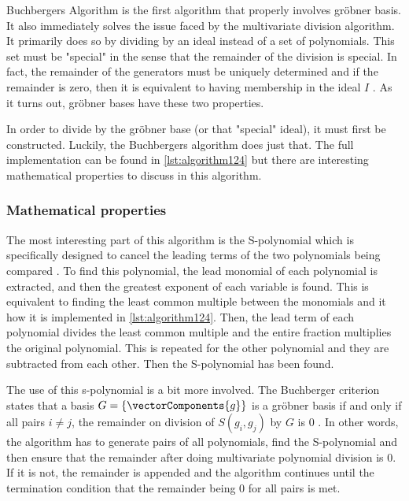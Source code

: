 Buchbergers Algorithm is the first algorithm that properly involves gröbner basis. It also immediately solves the issue faced by the multivariate division algorithm. It primarily does so by dividing by an ideal instead of a set of polynomials. This set must be "special" in the sense that the remainder of the division is special. In fact, the remainder of the generators must be uniquely determined and if the remainder is zero, then it is equivalent to having membership in the ideal $I$ \cite{Applied}. As it turns out, gröbner bases have these two properties.

In order to divide by the gröbner base (or that "special" ideal), it must first be constructed. Luckily, the Buchbergers algorithm does just that. The full implementation can be found in \ref{lst:algorithm124} but there are interesting mathematical properties to discuss in this algorithm. 

\subsubsection{Mathematical properties}
The most interesting part of this algorithm is the S-polynomial which is specifically designed to cancel the leading terms of the two polynomials being compared \cite{Applied}. To find this polynomial, the lead monomial of each polynomial is extracted, and then the greatest exponent of each variable is found. This is equivalent to finding the least common multiple between the monomials and it how it is implemented in \ref{lst:algorithm124}. Then, the lead term of each polynomial divides the least common multiple and the entire fraction multiplies the original polynomial. This is repeated for the other polynomial and they are subtracted from each other. Then the S-polynomial has been found.

The use of this s-polynomial is a bit more involved. The Buchberger criterion states that a basis $G=\{\vectorComponents{g}\}$ is a gröbner basis if and only if all pairs $i \neq j$, the remainder on division of $S(g_i,g_j)$ by $G$ is 0 \cite{Theory}. In other words, the algorithm has to generate pairs of all polynomials, find the S-polynomial and then ensure that the remainder after doing multivariate polynomial division is $0$. If it is not, the remainder is appended and the algorithm continues until the termination condition that the remainder being $0$ for all pairs is met.   